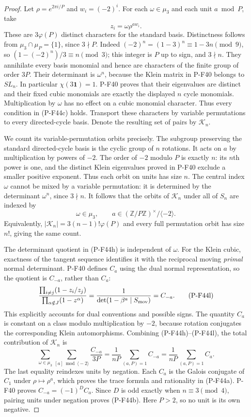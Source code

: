 \documentclass[11pt,a4paper]{article}
\begin{document}
\begin{proof}
Let $\rho=e^{2\pi i/P}$ and $w_i=(-2)^i$.
For each $\omega\in\mu_3$ and each unit $a\bmod P$, take
\[
                   z_i=\omega\rho^{a w_i}.
 \tag{P-F44j}
\]
These are $3\varphi(P)$ distinct characters for the
standard basis. Distinctness follows from
$\mu_3\cap\mu_P=\{1\}$, since $3\nmid P$.
Indeed $(-2)^n=(1-3)^n\equiv1-3n\pmod9$, so
$(1-(-2)^n)/3\equiv n\pmod3$; this integer is $P$
up to sign, and $3\nmid n$.
They annihilate every basis monomial and hence are
characters of the finite group of order $3P$.
Their determinant is $\omega^n$, because the Klein
matrix in P-F40 belongs to $SL_n$. In particular
$\chi(3\mathbf1)=1$.
P-F40 proves that their eigenvalues are distinct and
their fixed cubic monomials are exactly the displayed
$n$ cycle monomials. Multiplication by $\omega$ has no
effect on a cubic monomial character. Thus every
condition in (P-F44c) holds.
Transport these characters by variable permutations to
every directed-cycle basis. Denote the resulting set
of pairs by $\mathscr K_n$.

We count its variable-permutation orbits precisely.
The subgroup preserving the standard directed-cycle
basis is the cyclic group of $n$ rotations. It acts
on $a$ by multiplication by powers of $-2$.
The order of $-2$ modulo $P$ is exactly $n$: its
$n$th power is one, and the distinct Klein eigenvalues
proved in P-F40 exclude a smaller positive exponent.
Thus each orbit on units has size $n$.
The central index $\omega$ cannot be mixed by a variable
permutation: it is determined by the determinant
$\omega^n$, since $3\nmid n$.
It follows that the orbits of $\mathscr K_n$ under all
of $S_n$ are indexed by
\[
 \omega\in\mu_3,\qquad
 a\in(\mathbb Z/P\mathbb Z)^\times/\langle-2\rangle.
 \tag{P-F44k}
\]
Equivalently,
$|\mathscr K_n|=3(n-1)!\varphi(P)$ and every full
permutation orbit has size $n!$, giving the same count.

The determinant quotient in (P-F44h) is independent of
$\omega$. For the Klein cubic, exactness of the tangent
sequence identifies it with the reciprocal moving
\emph{primal} normal determinant. P-F40 defines $C_a$
using the dual normal representation, so the quotient
is $C_{-a}$, rather than $C_a$:
\[
 \frac{\prod_{i\ne j}(1-z_i/z_j)}
      {\prod_{\alpha\notin J}(1-z^\alpha)}
       =\frac1{\det(1-\beta^a\mid S_{\rm mov})}
       =C_{-a}.
 \tag{P-F44l}
\]
This explicitly accounts for dual conventions and
possible signs.
The quantity $C_a$ is constant on a class modulo
multiplication by $-2$, because rotation conjugates
the corresponding Klein automorphisms.
Combining (P-F44h)--(P-F44l), the total contribution
of $\mathscr K_n$ is
\[
 \sum_{\omega\in\mu_3}
 \sum_{[a]\bmod\langle-2\rangle}\frac{C_{-a}}{3P}
   =\frac1{nP}\sum_{(a,P)=1}C_{-a}
   =\frac1{nP}\sum_{(a,P)=1}C_a.
 \tag{P-F44m}
\]
The last equality reindexes units by negation.
Each $C_a$ is the Galois conjugate of $C_1$ under
$\rho\mapsto\rho^a$, which proves the trace formula
and rationality in (P-F44a).
P-F40 proves $C_{-a}=(-1)^D C_a$.
Since $D$ is odd exactly when $n\equiv3\pmod4$,
pairing units under negation proves (P-F44b).
Here $P>2$, so no unit is its own negative.


\end{proof}
\end{document}
